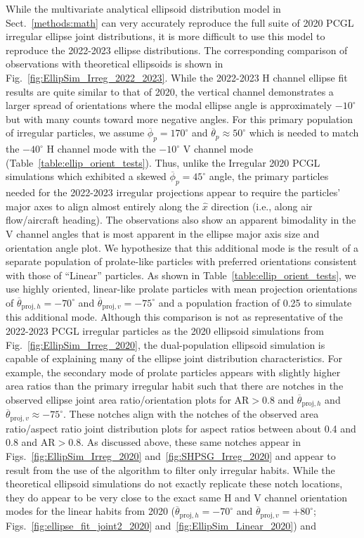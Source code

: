 \documentclass[amt, manuscript]{copernicus}
\begin{document}
While the multivariate analytical ellipsoid distribution model in Sect.~\ref{methods:math} can very accurately reproduce the full suite of 2020 PCGL irregular ellipse joint distributions, it is more difficult to use this model to reproduce the 2022-2023 ellipse distributions. The corresponding comparison of observations with theoretical ellipsoids is shown in Fig.~\ref{fig:EllipSim_Irreg_2022_2023}. While the 2022-2023 H channel ellipse fit results are quite similar to that of 2020, the vertical channel demonstrates a larger spread of orientations where the modal ellipse angle is approximately $-10^{\circ}$ but with many counts toward more negative angles. For this primary population of irregular particles, we assume $\overline{\phi}_{p} = 170^{\circ}$ and $\overline{\theta}_{p} \approx 50^{\circ}$ which is needed to match the $-40^{\circ}$ H channel mode with the $-10^{\circ}$ V channel mode  (Table~\ref{table:ellip_orient_tests}). Thus, unlike the Irregular 2020 PCGL simulations which exhibited a skewed $\overline{\phi}_{p} = 45^{\circ}$ angle, the primary particles needed for the 2022-2023 irregular projections appear to require the particles' major axes to align almost entirely along the $\hat{x}$ direction (i.e., along air flow/aircraft heading). The observations also show an apparent bimodality in the V channel angles that is most apparent in the ellipse major axis size and orientation angle plot. We hypothesize that this additional mode is the result of a separate population of prolate-like particles with preferred orientations consistent with those of ``Linear'' particles. As shown in Table~\ref{table:ellip_orient_tests}, we use highly oriented, linear-like prolate particles with mean projection orientations of $\overline{\theta}_{\mathrm{proj},h}=-70^{\circ}$ and $\overline{\theta}_{\mathrm{proj},v}=-75^{\circ}$ and a population fraction of 0.25 to simulate this additional mode. Although this comparison is not as representative of the 2022-2023 PCGL irregular particles as the 2020 ellipsoid simulations from Fig.~\ref{fig:EllipSim_Irreg_2020}, the dual-population ellipsoid simulation is capable of explaining many of the ellipse joint distribution characteristics. For example, the secondary mode of prolate particles appears with slightly higher area ratios than the primary irregular habit such that there are notches in the observed ellipse joint area ratio/orientation plots for $\mathrm{AR}>0.8$ and $\overline{\theta}_{\mathrm{proj},h}$ and $\overline{\theta}_{\mathrm{proj},v} \approx -75^{\circ}$. These notches align with the notches of the observed area ratio/aspect ratio joint distribution plots for aspect ratios between about 0.4 and 0.8 and $\mathrm{AR}>0.8$. As discussed above, these same notches appear in Figs.~\ref{fig:EllipSim_Irreg_2020} and~\ref{fig:SHPSG_Irreg_2020} and appear to result from the use of the \citet{Schima2024} algorithm to filter only irregular habits. While the theoretical ellipsoid simulations do not exactly replicate these notch locations, they do appear to be very close to the exact same H and V channel orientation modes for the linear habits from 2020 ($\overline{\theta}_{\mathrm{proj},h}=-70^{\circ}$ and $\overline{\theta}_{\mathrm{proj},v}=+80^{\circ}$; Figs.~\ref{fig:ellipse_fit_joint2_2020} and~\ref{fig:EllipSim_Linear_2020}) and 
\end{document}
